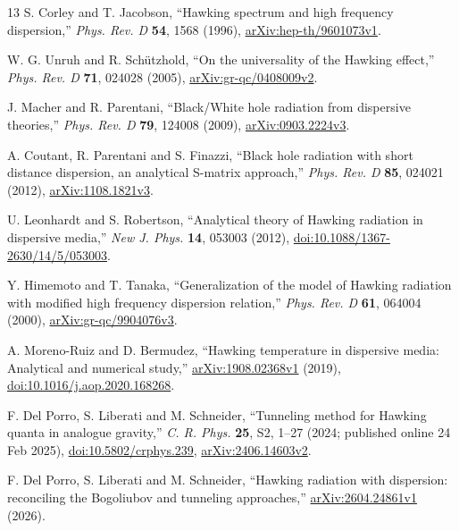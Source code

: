 \documentclass[10pt,a4paper]{article}
\begin{document}
\clearpage
\begin{thebibliography}{13}
S. Corley and T. Jacobson,
``Hawking spectrum and high frequency dispersion,''
\emph{Phys. Rev. D} \textbf{54}, 1568 (1996),
\href{https://arxiv.org/abs/hep-th/9601073v1}{arXiv:hep-th/9601073v1}.

W. G. Unruh and R. Sch\"utzhold,
``On the universality of the Hawking effect,''
\emph{Phys. Rev. D} \textbf{71}, 024028 (2005),
\href{https://arxiv.org/abs/gr-qc/0408009v2}{arXiv:gr-qc/0408009v2}.

J. Macher and R. Parentani,
``Black/White hole radiation from dispersive theories,''
\emph{Phys. Rev. D} \textbf{79}, 124008 (2009),
\href{https://arxiv.org/abs/0903.2224v3}{arXiv:0903.2224v3}.

A. Coutant, R. Parentani and S. Finazzi,
``Black hole radiation with short distance dispersion, an analytical
S-matrix approach,'' \emph{Phys. Rev. D} \textbf{85}, 024021 (2012),
\href{https://arxiv.org/abs/1108.1821v3}{arXiv:1108.1821v3}.

U. Leonhardt and S. Robertson,
``Analytical theory of Hawking radiation in dispersive media,''
\emph{New J. Phys.} \textbf{14}, 053003 (2012),
\href{https://doi.org/10.1088/1367-2630/14/5/053003}{doi:10.1088/1367-2630/14/5/053003}.

Y. Himemoto and T. Tanaka,
``Generalization of the model of Hawking radiation with modified high
frequency dispersion relation,'' \emph{Phys. Rev. D} \textbf{61}, 064004 (2000),
\href{https://arxiv.org/abs/gr-qc/9904076v3}{arXiv:gr-qc/9904076v3}.

A. Moreno-Ruiz and D. Bermudez,
``Hawking temperature in dispersive media: Analytical and numerical study,''
\href{https://arxiv.org/abs/1908.02368v1}{arXiv:1908.02368v1} (2019),
\href{https://doi.org/10.1016/j.aop.2020.168268}{doi:10.1016/j.aop.2020.168268}.

F. Del Porro, S. Liberati and M. Schneider,
``Tunneling method for Hawking quanta in analogue gravity,''
\emph{C. R. Phys.} \textbf{25}, S2, 1--27 (2024; published online 24 Feb 2025),
\href{https://doi.org/10.5802/crphys.239}{doi:10.5802/crphys.239},
\href{https://arxiv.org/abs/2406.14603v2}{arXiv:2406.14603v2}.

F. Del Porro, S. Liberati and M. Schneider,
``Hawking radiation with dispersion: reconciling the Bogoliubov and
tunneling approaches,''
\href{https://arxiv.org/abs/2604.24861v1}{arXiv:2604.24861v1} (2026).


\end{thebibliography}
\end{document}
